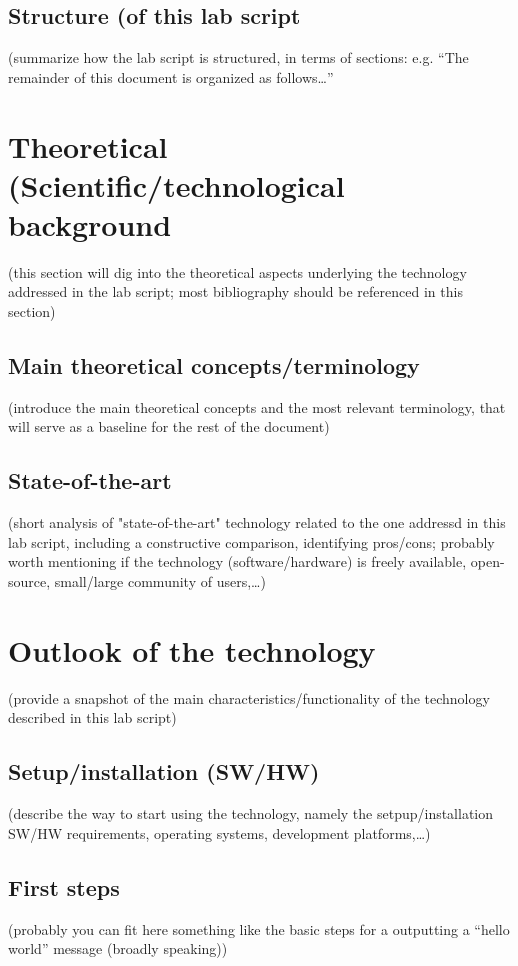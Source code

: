 \documentclass{article}
\begin{document}
\subsection{Structure (of this lab script}
(summarize how the lab script is structured, in terms of sections: e.g. “The remainder of this document is organized as follows…”

\section{Theoretical (Scientific/technological background}
(this section will dig into the theoretical aspects underlying the technology addressed in the lab script; most bibliography should be referenced in this section)
\subsection{Main theoretical concepts/terminology}
(introduce the main theoretical concepts and the most relevant terminology, that will serve as a baseline for the rest of the document)
\subsection{State-of-the-art}
(short analysis of "state-of-the-art" technology related to the one addressd in this lab script, including a constructive comparison, identifying pros/cons; probably worth mentioning if the technology (software/hardware) is freely available, open-source, small/large community of users,…)

\section{Outlook of the technology}
(provide a snapshot of the main characteristics/functionality of the technology described in this lab script)
\subsection{Setup/installation (SW/HW)}
(describe the way to start using the technology, namely the setpup/installation SW/HW requirements, operating systems, development platforms,…)
\subsection{First steps}
(probably you can fit here something like the basic steps for a outputting a “hello world” message (broadly speaking))
\end{document}
